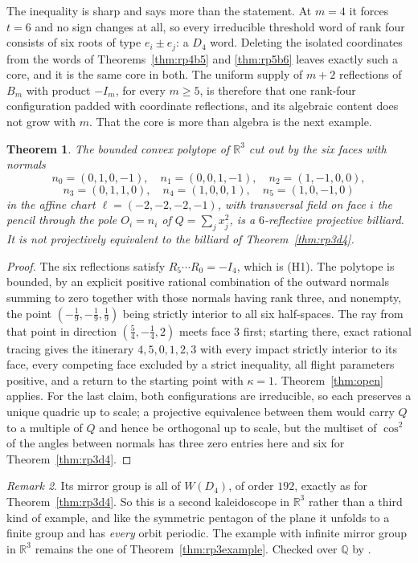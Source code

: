 \documentclass[11pt,a4paper]{article}
\theoremstyle{plain}
\newtheorem{theorem}{Theorem}[section]
\theoremstyle{definition}
\theoremstyle{remark}
\newtheorem{remark}[theorem]{Remark}
\begin{document}
The inequality is sharp and says more than the statement. At $m=4$ it forces $t=6$
and no sign changes at all, so every irreducible threshold word of rank four consists
of six roots of type $e_i\pm e_j$: a $D_4$ word. Deleting the isolated coordinates
from the words of Theorems~\ref{thm:rp4b5} and \ref{thm:rp5b6} leaves exactly such a
core, and it is the same core in both. The uniform supply of $m+2$ reflections of
$B_m$ with product $-I_m$, for every $m\ge5$, is therefore that one rank-four
configuration padded with coordinate reflections, and its algebraic content does not
grow with $m$. That the core is more than algebra is the next example.

\begin{theorem}\label{thm:rp3d4b}
The bounded convex polytope of $\mathbb{R}^3$ cut out by the six faces with normals
\[
  n_0=(0,1,0,-1),\quad n_1=(0,0,1,-1),\quad n_2=(1,-1,0,0),
\]
\[
  n_3=(0,1,1,0),\quad n_4=(1,0,0,1),\quad n_5=(1,0,-1,0)
\]
in the affine chart $\ell=(-2,-2,-2,-1)$, with transversal field on face $i$ the
pencil through the pole $O_i=n_i$ of $Q=\sum_j x_j^2$, is a $6$-reflective projective
billiard. It is not projectively equivalent to the billiard of
Theorem~\ref{thm:rp3d4}.
\end{theorem}

\begin{proof}
The six reflections satisfy $R_5\cdots R_0=-I_4$, which is (H1). The polytope is
bounded, by an explicit positive rational combination of the outward normals summing
to zero together with those normals having rank three, and nonempty, the point
$(-\tfrac19,-\tfrac19,\tfrac19)$ being strictly interior to all six half-spaces. The
ray from that point in direction $(\tfrac54,-\tfrac14,2)$ meets face $3$ first;
starting there, exact rational tracing gives the itinerary $4,5,0,1,2,3$ with every
impact strictly interior to its face, every competing face excluded by a strict
inequality, all flight parameters positive, and a return to the starting point with
$\kappa=1$. Theorem~\ref{thm:open} applies. For the last claim, both configurations
are irreducible, so each preserves a unique quadric up to scale; a projective
equivalence between them would carry $Q$ to a multiple of $Q$ and hence be orthogonal
up to scale, but the multiset of $\cos^2$ of the angles between normals has three
zero entries here and six for Theorem~\ref{thm:rp3d4}.
\end{proof}

\begin{remark}
Its mirror group is all of $W(D_4)$, of order $192$, exactly as for
Theorem~\ref{thm:rp3d4}. So this is a second kaleidoscope in $\mathbb{R}^3$ rather
than a third kind of example, and like the symmetric pentagon of the plane it unfolds
to a finite group and has \emph{every} orbit periodic. The example with infinite
mirror group in $\mathbb{R}^3$ remains the one of Theorem~\ref{thm:rp3example}.
Checked over $\mathbb{Q}$ by .
\end{remark}
\end{document}

